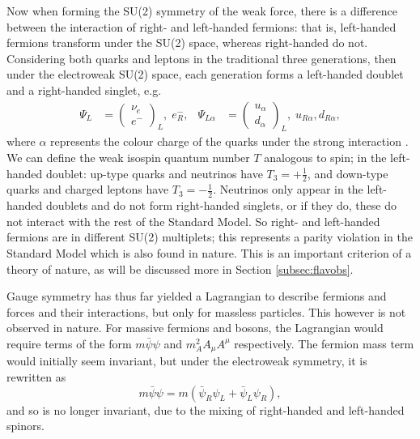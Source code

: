 \documentclass[a4paper,12pt]{article}
\begin{document}
Now when forming the SU(2) symmetry of the weak force, there is a difference between the interaction of right- and left-handed fermions: that is, left-handed fermions transform under the SU(2) space, whereas right-handed do not.
Considering both quarks and leptons in the traditional three generations, then under the electroweak SU(2) space, each generation forms a left-handed doublet and a right-handed singlet, e.g.
\begin{align}
    \label{eq:doublet}
    \Psi_L &=\begin{pmatrix} \nu_e \\ e^- \end{pmatrix}_L,\; e_R^-, & \Psi_{L\alpha} &=\begin{pmatrix} u_\alpha \\ d_\alpha\end{pmatrix}_L,\; u_{R\alpha},d_{R\alpha},
\end{align}
where $\alpha$ represents the colour charge of the quarks under the strong interaction \cite{kane}.
We can define the weak isospin quantum number $T$ analogous to spin; in the left-handed doublet: up-type quarks and neutrinos have $T_3=+\frac12$, and down-type quarks and charged leptons have $T_3=-\frac12$.
Neutrinos only appear in the left-handed doublets and do not form right-handed singlets, or if they do, these do not interact with the rest of the Standard Model.
So right- and left-handed fermions are in different SU(2) multiplets; this represents a parity violation in the Standard Model which is also found in nature. 
This is an important criterion of a theory of nature, as will be discussed more in Section \ref{subsec:flavobs}.

Gauge symmetry has thus far yielded a Lagrangian to describe fermions and forces and their interactions, but only for massless particles. 
This however is not observed in nature. 
For massive fermions and bosons, the Lagrangian would require terms of the form $m\bar{\psi}\psi$ and $m_A^2A_\mu A^\mu$ respectively.
The fermion mass term would initially seem invariant, but under the electroweak symmetry, it is rewritten as
\begin{equation}
    \label{eq:mass}
    m\bar{\psi}\psi = m(\bar{\psi}_R\psi_L+\bar{\psi}_L\psi_R),
\end{equation}
and so is no longer invariant, due to the mixing of right-handed and left-handed spinors. 
\end{document}
